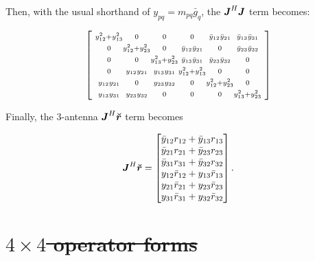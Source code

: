 \documentclass[useAMS,usenatbib]{mn2e}
\makeatletter
\newcommand{\mat}[1]{{\bmath{#1}}}
\newcommand{\JJ}{\mat{J}} %
\newcommand{\Matrix}[2]{\left [ \begin{array}{@{}#1@{}}#2\end{array} \right ]}
\newcommand{\AUG}[1]{\bmath{\breve{#1}}}
\newcommand{\Rr}{\AUG{r}}
\numberwithin{equation}{section}
\providecommand{\DIFdel}[1]{{\protect\color{red}\sout{#1}}}                      %
\providecommand{\DIFaddbegin}{} %
\providecommand{\DIFaddend}{} %
\providecommand{\DIFdelbegin}{} %
\providecommand{\DIFdelend}{} %
\makeatother
\begin{document}
Then, with the usual shorthand of $y_{pq} = m_{pq} \bar{g}_q$, the
$\JJ^H\JJ$ term becomes:

\begin{equation}
\label{eq:JHJ:3ant}
\Matrix{@{~}c@{}c@{}c@{}c@{}c@{}c@{~}}{
\scriptstyle\yysq{12}{13} &\scriptstyle 0             &\scriptstyle 0             &\scriptstyle 0             &\scriptstyle \bb{1}{2}       &\scriptstyle \bb{1}{3} \\
\scriptstyle0             &\scriptstyle \yysq{12}{23} &\scriptstyle 0             &\scriptstyle \bb{1}{2}       &\scriptstyle 0             &\scriptstyle \bb{2}{3} \\
\scriptstyle0             &\scriptstyle 0             &\scriptstyle \yysq{13}{23} &\scriptstyle \bb{1}{3}       &\scriptstyle \bb{2}{3}       &\scriptstyle 0       \\
\scriptstyle0             &\scriptstyle \bbb{1}{2}      &\scriptstyle \bbb{1}{3}      &\scriptstyle \yysq{12}{13} &\scriptstyle 0             &\scriptstyle 0       \\ 
\scriptstyle\bbb{1}{2}      &\scriptstyle 0             &\scriptstyle \bbb{2}{3}      &\scriptstyle 0             &\scriptstyle \yysq{12}{23} &\scriptstyle 0 \\
\scriptstyle\bbb{1}{3}      &\scriptstyle \bbb{2}{3}      &\scriptstyle 0             &\scriptstyle 0             &\scriptstyle 0             &\scriptstyle  \yysq{13}{23} \\
}
\end{equation}

Finally, the 3-antenna $\JJ^H\Rr$ term becomes

\begin{equation}
\label{eq:JHR:3ant}
\JJ^H\Rr = \Matrix{c}{
\bar{y}_{12} r_{12} + \bar{y}_{13} r_{13} \\
\bar{y}_{21} r_{21} + \bar{y}_{23} r_{23} \\
\bar{y}_{31} r_{31} + \bar{y}_{32} r_{32} \\
y_{12} \bar{r}_{12} + y_{13} \bar{r}_{13}   \\
y_{21} \bar{r}_{21} + y_{23} \bar{r}_{23}   \\
y_{31} \bar{r}_{31} + y_{32} \bar{r}_{32}   \\
}.
\end{equation}


\DIFdelbegin \section{\DIFdel{$4\times4$ operator forms}}
\addtocounter{section}{-1}%
\DIFdelend \DIFaddbegin \newcommand{\WW}{\mathbb{W}}
\newcommand{\WWi}{\mathbb{W}^{-1}}
\DIFaddend 
\end{document}
